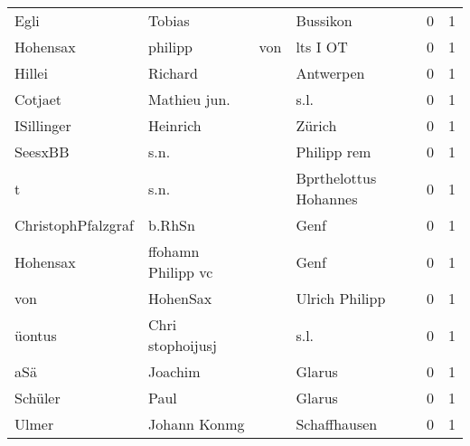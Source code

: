 \documentclass[10pt,a4paper,landscape]{article}
\begin{document}
\begin{longtable}{llllrr}
                     Egli &                             Tobias &             &                                    Bussikon &          0 &         1 \\
                 Hohensax &                            philipp &         von &                                    lts I OT &          0 &         1 \\
                   Hillei &                            Richard &             &                                   Antwerpen &          0 &         1 \\
                  Cotjaet &                       Mathieu jun. &             &                                        s.l. &          0 &         1 \\
               ISillinger &                           Heinrich &             &                                      Zürich &          0 &         1 \\
                  SeesxBB &                               s.n. &             &                                 Philipp rem &          0 &         1 \\
                        t &                               s.n. &             &                       Bprthelottus Hohannes &          0 &         1 \\
       ChristophPfalzgraf &                             b.RhSn &             &                                        Genf &          0 &         1 \\
                 Hohensax &                 ffohamn Philipp vc &             &                                        Genf &          0 &         1 \\
                      von &                           HohenSax &             &                              Ulrich Philipp &          0 &         1 \\
                   üontus &                   Chri stophoijusj &             &                                        s.l. &          0 &         1 \\
                      aSä &                            Joachim &             &                                      Glarus &          0 &         1 \\
                  Schüler &                               Paul &             &                                      Glarus &          0 &         1 \\
                    Ulmer &                       Johann Konmg &             &                                Schaffhausen &          0 &         1 \\

\end{longtable}
\end{document}
